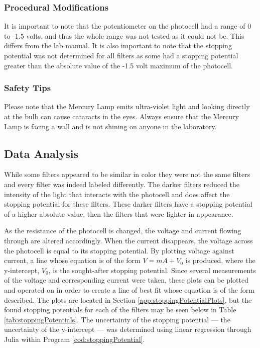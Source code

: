 \documentclass[a4paper]{article}
\begin{document}
\subsubsection{Procedural Modifications}

\qq It is important to note that the potentiometer on the photocell
had a range of 0 to -1.5 volts, and thus the whole range was not
tested as it could not be. This differs from the lab manual. It is
also important to note that the stopping potential was not determined
for all filters as some had a stopping potential greater than the
absolute value of the -1.5 volt maximum of the photocell.

\subsubsection{Safety Tips}

\qq Please note that the Mercury Lamp emits ultra-violet light and
looking directly at the bulb can cause cataracts in the eyes. Always
ensure that the Mercury Lamp is facing a wall and is not shining on
anyone in the laboratory.


\subsection{Data Analysis}


\qq While some filters appeared to be similar in color they were not
the same filters and every filter was indeed labeled differently. The
darker filters reduced the intensity of the light that interacts with
the photocell and does affect the stopping potential for these
filters. These darker filters have a stopping potential of a higher
absolute value, then the filters that were lighter in appearance. 


\qq As the resistance of the photocell is changed, the voltage and current
flowing through are altered accordingly. When the current disappears, the
voltage across the photocell is equal to its stopping potential. By plotting
voltage against current, a line whose equation is of the form \( V = mA + V_0 \)
is produced, where the y-intercept, \( V_0 \), is the sought-after stopping
potential. Since several measurements of the voltage and corresponding current
were taken, these plots can be plotted and operated on in order to create a line
of best fit whose equation is of the form described. The plots are located in
Section \ref{app:stoppingPotentialPlots}, but the found stopping potentials for
each of the filters may be seen below in Table \ref{tab:stoppingPotentials}. The
uncertainty of the stopping potential --- the uncertainty of the y-intercept ---
was determined using linear regression through Julia within Program
\ref{cod:stoppingPotential}.
\end{document}
